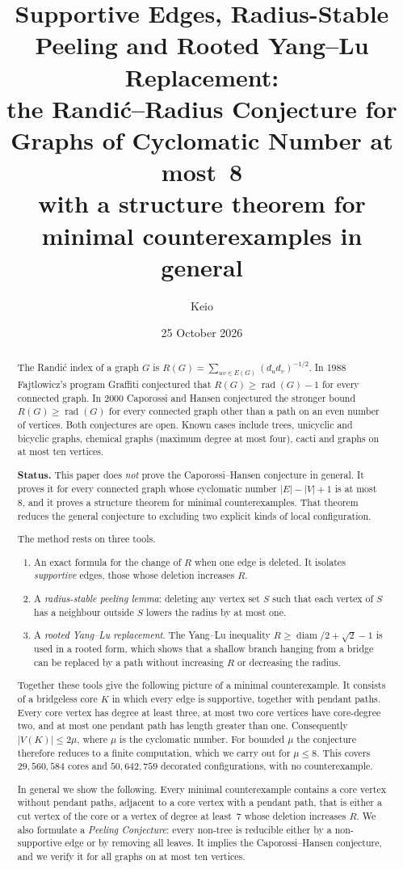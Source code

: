 \documentclass[11pt,a4paper]{article}
\title{\bfseries Supportive Edges, Radius-Stable Peeling and Rooted Yang--Lu Replacement:\\
the Randi\'c--Radius Conjecture for Graphs of Cyclomatic Number at most~8\\[6pt]
\large with a structure theorem for minimal counterexamples in general}
\author{Keio}
\date{25 October 2026}
\theoremstyle{definition}
\newcommand{\rad}{\operatorname{rad}}
\newcommand{\diam}{\operatorname{diam}}
\begin{document}
\maketitle

\begin{abstract}
The Randi\'c index of a graph $G$ is $R(G)=\sum_{uv\in E(G)}(d_ud_v)^{-1/2}$. In 1988 Fajtlowicz's program Graffiti conjectured that $R(G)\ge \rad(G)-1$ for every connected graph. In 2000 Caporossi and Hansen conjectured the stronger bound $R(G)\ge\rad(G)$ for every connected graph other than a path on an even number of vertices. Both conjectures are open. Known cases include trees, unicyclic and bicyclic graphs, chemical graphs (maximum degree at most four), cacti and graphs on at most ten vertices.

\textbf{Status.} This paper does \emph{not} prove the Caporossi--Hansen conjecture in general. It proves it for every connected graph whose cyclomatic number $|E|-|V|+1$ is at most~$8$, and it proves a structure theorem for minimal counterexamples. That theorem reduces the general conjecture to excluding two explicit kinds of local configuration.

The method rests on three tools.
\begin{enumerate}
\item An exact formula for the change of $R$ when one edge is deleted. It isolates \emph{supportive} edges, those whose deletion increases $R$.
\item A \emph{radius-stable peeling lemma}: deleting any vertex set $S$ such that each vertex of $S$ has a neighbour outside $S$ lowers the radius by at most one.
\item A \emph{rooted Yang--Lu replacement}. The Yang--Lu inequality $R\ge \diam/2+\sqrt2-1$ is used in a rooted form, which shows that a shallow branch hanging from a bridge can be replaced by a path without increasing $R$ or decreasing the radius.
\end{enumerate}

Together these tools give the following picture of a minimal counterexample. It consists of a bridgeless core $K$ in which every edge is supportive, together with pendant paths. Every core vertex has degree at least three, at most two core vertices have core-degree two, and at most one pendant path has length greater than one. Consequently $|V(K)|\le 2\mu$, where $\mu$ is the cyclomatic number. For bounded $\mu$ the conjecture therefore reduces to a finite computation, which we carry out for $\mu\le8$. This covers $29{,}560{,}584$ cores and $50{,}642{,}759$ decorated configurations, with no counterexample.

In general we show the following. Every minimal counterexample contains a core vertex without pendant paths, adjacent to a core vertex with a pendant path, that is either a cut vertex of the core or a vertex of degree at least~$7$ whose deletion increases $R$. We also formulate a \emph{Peeling Conjecture}: every non-tree is reducible either by a non-supportive edge or by removing all leaves. It implies the Caporossi--Hansen conjecture, and we verify it for all graphs on at most ten vertices.
\end{abstract}
\end{document}
